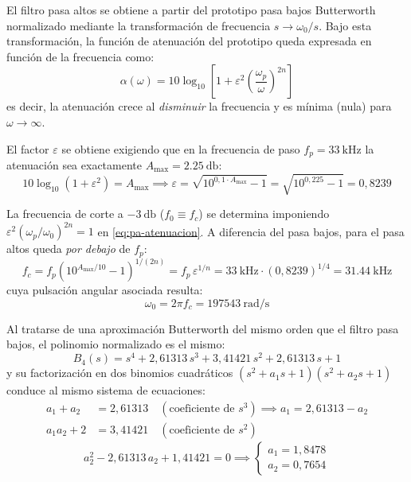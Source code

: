 El filtro pasa altos se obtiene a partir del prototipo pasa bajos Butterworth normalizado mediante la transformación
de frecuencia $s \rightarrow \omega_0 / s$. Bajo esta transformación, la función de atenuación del prototipo queda
expresada en función de la frecuencia como:
\begin{equation}
  \alpha(\omega) = 10 \log_{10} \left[ 1 + \varepsilon^2 \left( \frac{\omega_p}{\omega} \right)^{2n} \right]
  \label{eq:pa-atenuacion}
\end{equation}
es decir, la atenuación crece al \emph{disminuir} la frecuencia y es mínima (nula) para $\omega \to \infty$.

El factor $\varepsilon$ se obtiene exigiendo que en la frecuencia de paso $f_p = \SI{33}{\kilo\hertz}$ la atenuación
sea exactamente $A_{\max} = \SI{2.25}{\decibel}$:
\begin{equation}
  10 \log_{10} \left( 1 + \varepsilon^2 \right) = A_{\max} \implies
  \varepsilon = \sqrt{10^{0{,}1 \cdot A_{\max}} - 1} = \sqrt{10^{0{,}225} - 1} = 0{,}8239
  \label{eq:pa-epsilon}
\end{equation}

La frecuencia de corte a $\SI{-3}{\decibel}$ ($f_0 \equiv f_c$) se determina imponiendo
$\varepsilon^2 (\omega_p/\omega_0)^{2n} = 1$ en \eqref{eq:pa-atenuacion}. A diferencia del pasa bajos, para el pasa
altos queda \emph{por debajo} de $f_p$:
\begin{equation}
  f_c = f_p \left( 10^{A_{\max}/10} - 1 \right)^{1/(2n)} = f_p\,\varepsilon^{1/n}
  = \SI{33}{\kilo\hertz} \cdot \left( 0{,}8239 \right)^{1/4} = \SI{31.44}{\kilo\hertz}
  \label{eq:pa-fc}
\end{equation}
cuya pulsación angular asociada resulta:
\begin{equation}
  \omega_0 = 2\pi f_c = \SI{197543}{\radian/\second}
  \label{eq:pa-omega0}
\end{equation}

Al tratarse de una aproximación Butterworth del mismo orden que el filtro pasa bajos, el polinomio normalizado es el
mismo:
\begin{equation}
  B_4(s) = s^4 + 2{,}61313\,s^3 + 3{,}41421\,s^2 + 2{,}61313\,s + 1
\end{equation}
y su factorización en dos binomios cuadráticos $\left( s^2 + a_1 s + 1 \right) \left( s^2 + a_2 s + 1 \right)$
conduce al mismo sistema de ecuaciones:
\begin{align*}
  a_1 + a_2 &= 2{,}61313 \quad (\text{coeficiente de } s^3) \implies a_1 = 2{,}61313 - a_2 \\
  a_1 a_2 + 2 &= 3{,}41421 \quad (\text{coeficiente de } s^2)
\end{align*}
\begin{equation}
  a_2^2 - 2{,}61313\,a_2 + 1{,}41421 = 0 \implies \begin{cases} a_1 = 1{,}8478 \\ a_2 = 0{,}7654 \end{cases}
\end{equation}

